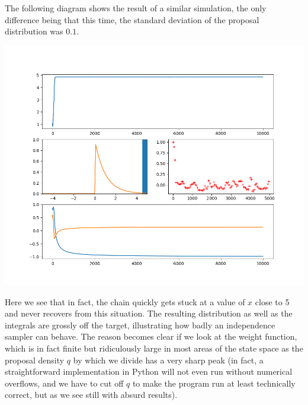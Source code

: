\documentclass[a4paper, draft]{article}
\theoremstyle{own}
\theoremstyle{remark}
\begin{document}
The following diagram shows the result of a similar simulation, the only difference being that this time, the standard deviation of the proposal distribution was $0.1$.

\includegraphics[scale=.45]{MetropolisIndependentBad.png}

Here we see that in fact, the chain quickly gets stuck at a value of $x$ close to 5 and never recovers from this situation. The resulting distribution as well as the integrals are grossly off the target, illustrating how badly an independence sampler can behave. The reason becomes clear if we look at the weight function, which is in fact finite but ridiculously large in most areas of the state space as the proposal density $q$ by which we divide has a very sharp peak (in fact, a straightforward implementation in Python will not even run without numerical overflows, and we have to cut off $q$ to make the program run at least technically correct, but as we see still with absurd results).
\end{document}
